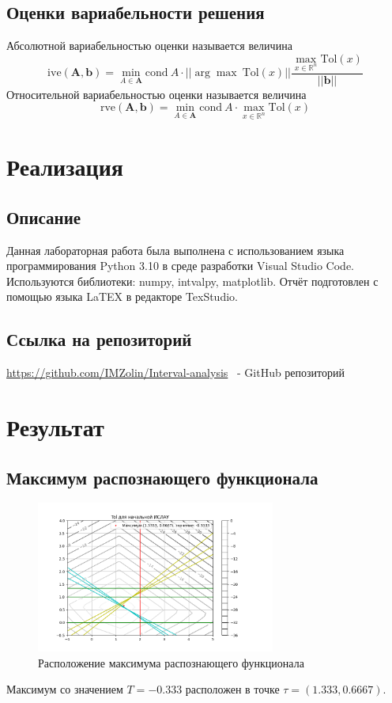 \documentclass[a4paper,14pt]{article}
\begin{document}
	\subsection{Оценки вариабельности решения}
	Абсолютной вариабельностью оценки называется величина
	\begin{equation}
		\mathrm{ive}(\mathbf{A},\mathbf{b})=\min\limits_{A\in\mathbf{A}}\mathrm{cond}\:A\cdot||\arg\max\:\mathrm{Tol}(x)||\frac{\max\limits_{x\in\mathbb{R}^n}\mathrm{Tol}(x)}{||\mathbf{b}||}
	\end{equation}
	Относительной вариабельностью оценки называется величина
	\begin{equation}
		\mathrm{rve}(\mathbf{A},\mathbf{b})=\min\limits_{A\in\mathbf{A}}\mathrm{cond}\:A\cdot\max\limits_{x\in\mathbb{R}^n}\mathrm{Tol}(x)
	\end{equation}
	\section{Реализация}
	\subsection{Описание}
	Данная лабораторная работа была выполнена с использованием языка
	программирования Python 3.10 в среде разработки Visual Studio Code.
	Используются библиотеки: numpy, intvalpy, matplotlib.
	Отчёт подготовлен с помощью языка LaTEX в редакторе TexStudio.
	\subsection{Ссылка на репозиторий}
	\url{https://github.com/IMZolin/Interval-analysis} \ - GitHub репозиторий
	
	\section{Результат}
	\subsection{Максимум распознающего функционала}
	\begin{figure}[H]
		\centering
		\includegraphics[width=0.7\textwidth]{../src/pic/Tol1.png}
		\caption{Расположение максимума распознающего функционала} 
	\end{figure}
	Максимум со значением $T=-0.333$ расположен в точке $\tau=(1.333,0.6667)$.
\end{document}
